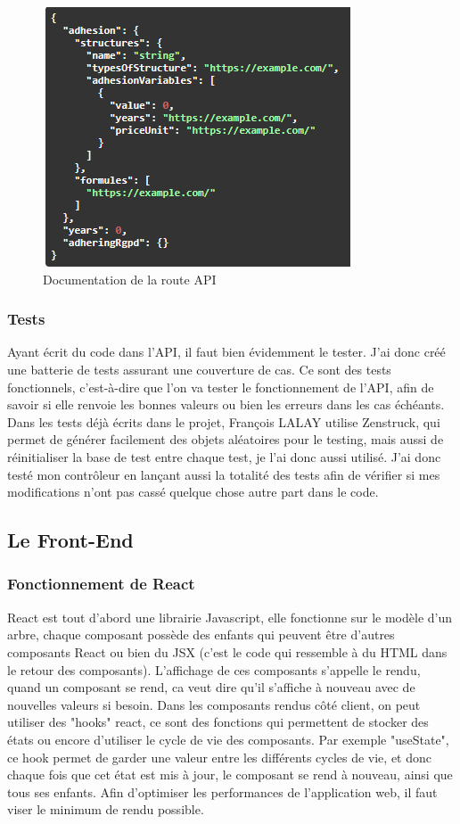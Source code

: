 \documentclass[a4paper,12pt]{report}
\begin{document}
\begin{figure}[ht]
    \centering
    \includegraphics[scale=0.8]{docSimulatorInput.png}
    \caption{Documentation de la route API}
    \label{fig:swagger-simulator-in}
\end{figure}


\subsubsection{Tests}
Ayant écrit du code dans l'API, il faut bien évidemment le tester. J'ai donc créé une batterie de tests assurant une couverture de cas. Ce sont des tests fonctionnels, c'est-à-dire que l'on va tester le fonctionnement de l'API, afin de savoir si elle renvoie les bonnes valeurs ou bien les erreurs dans les cas échéants. Dans les tests déjà écrits dans le projet, François LALAY utilise Zenstruck, qui permet de générer facilement des objets aléatoires pour le testing, mais aussi de réinitialiser la base de test entre chaque test, je l'ai donc aussi utilisé. J'ai donc testé mon contrôleur en lançant aussi la totalité des tests afin de vérifier si mes modifications n'ont pas cassé quelque chose autre part dans le code.

\subsection{Le Front-End}

\subsubsection{Fonctionnement de React}
React est tout d'abord une librairie Javascript, elle fonctionne sur le modèle d'un arbre, chaque composant possède des enfants qui peuvent être d'autres composants React ou bien du JSX (c'est le code qui ressemble à du HTML dans le retour des composants). L'affichage de ces composants s'appelle le rendu, quand un composant se rend, ca veut dire qu'il s'affiche à nouveau avec de nouvelles valeurs si besoin. Dans les composants rendus côté client, on peut utiliser des "hooks" react, ce sont des fonctions qui permettent de stocker des états ou encore d'utiliser le cycle de vie des composants. Par exemple "useState", ce hook permet de garder une valeur entre les différents cycles de vie, et donc chaque fois que cet état est mis à jour, le composant se rend à nouveau, ainsi que tous ses enfants. Afin d'optimiser les performances de l'application web, il faut viser le minimum de rendu possible.
\end{document}
